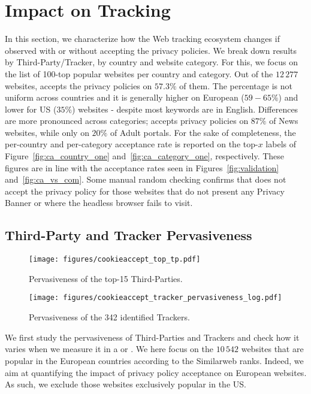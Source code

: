 \section{Impact on Tracking}
\label{sec:tracking}

In this section, we characterize how the Web tracking ecosystem changes if observed with or without accepting the privacy policies. We break down results by Third-Party/Tracker, by country and website category. For this, we focus on the list of 100-top popular websites per country and category. Out of the $12\,277$ websites, \TOOL accepts the privacy policies on $57.3\%$ of them. The percentage is not uniform across countries and it is generally higher on European ($59-65\%$) and lower for US ($35\%$) websites - despite most keywords are in English. Differences are more pronounced across categories; \TOOL accepts privacy policies on $87\%$ of News websites, while only on $20\%$ of Adult portals. For the sake of completeness, the per-country and per-category acceptance rate is reported on the top-$x$ labels of Figure~\ref{fig:ca_country_one} and~\ref{fig:ca_category_one}, respectively. These figures are in line with the acceptance rates seen in Figures~\ref{fig:validation} and~\ref{fig:ca_vs_com}. Some manual random checking confirms that \TOOL does not accept the privacy policy for those websites that do not present any Privacy Banner or where the headless browser fails to visit. 

\subsection{Third-Party and Tracker Pervasiveness}

\begin{figure}
    \centering
    \texttt{[image: figures/cookieaccept\_top\_tp.pdf]}
    \caption{Pervasiveness of the top-15 Third-Parties.}
    \label{fig:ca_prevasiveness_top}
\end{figure}

\begin{figure}
    \centering
    \texttt{[image: figures/cookieaccept\_tracker\_pervasiveness\_log.pdf]}
    \caption{Pervasiveness of the 342 identified Trackers.}
    \label{fig:ca_prevasiveness_all}

\end{figure}

We first study the pervasiveness of Third-Parties and Trackers and check how it varies when we measure it in a \BEFORE or \AFTER. We here focus on the $10\,542$ websites that are popular in the European countries according to the Similarweb ranks. Indeed, we aim at quantifying the impact of privacy policy acceptance on European websites. As such, we exclude those websites exclusively popular in the US.

